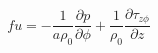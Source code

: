 \begin{equation}
    fu=-\frac{1}{a\rho_0}\frac{\partial p}{\partial \phi} + \frac{1}{\rho_0}\frac{\partial\tau_{z\phi}}{\partial z}
\label{EQN:MomV}
\end{equation}
